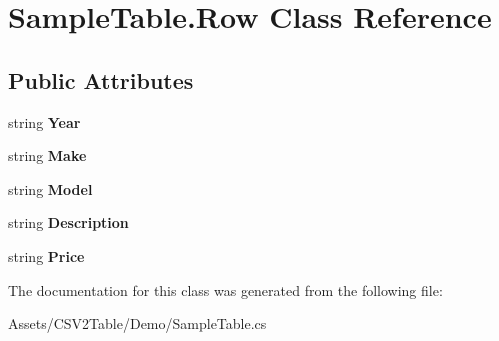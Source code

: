 \hypertarget{class_sample_table_1_1_row}{}\section{Sample\+Table.\+Row Class Reference}
\label{class_sample_table_1_1_row}
\subsection*{Public Attributes}
\begin{DoxyCompactItemize}
\item 
string {\bfseries Year}\hypertarget{class_sample_table_1_1_row_a19847c58f214bd0022118f4c2c80b4e2}{}\label{class_sample_table_1_1_row_a19847c58f214bd0022118f4c2c80b4e2}

\item 
string {\bfseries Make}\hypertarget{class_sample_table_1_1_row_ab96a6b2d18ba2e4c32976dfdcb64ff4a}{}\label{class_sample_table_1_1_row_ab96a6b2d18ba2e4c32976dfdcb64ff4a}

\item 
string {\bfseries Model}\hypertarget{class_sample_table_1_1_row_a2eeb29fb0558cd3d9dad3bea0b7c5337}{}\label{class_sample_table_1_1_row_a2eeb29fb0558cd3d9dad3bea0b7c5337}

\item 
string {\bfseries Description}\hypertarget{class_sample_table_1_1_row_a6d0678fa6d319a5197c06a422a46f6c3}{}\label{class_sample_table_1_1_row_a6d0678fa6d319a5197c06a422a46f6c3}

\item 
string {\bfseries Price}\hypertarget{class_sample_table_1_1_row_a52441e29a29258d2a835b396ff5291d1}{}\label{class_sample_table_1_1_row_a52441e29a29258d2a835b396ff5291d1}

\end{DoxyCompactItemize}


The documentation for this class was generated from the following file\+:\begin{DoxyCompactItemize}
\item 
Assets/\+C\+S\+V2\+Table/\+Demo/Sample\+Table.\+cs\end{DoxyCompactItemize}
